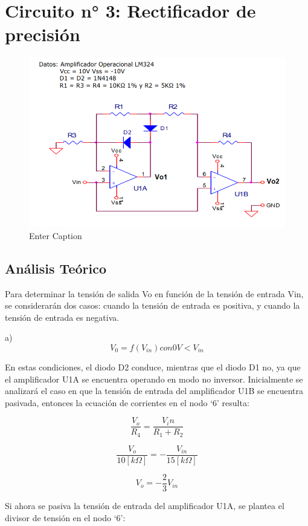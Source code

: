 \section{Circuito n° 3: Rectificador de precisión }

\begin{figure}
    \centering
    \includegraphics[width=0.5\linewidth]{Secciones/Circuito3/circuito.png}
    \caption{Enter Caption}
    \label{fig:enter-label}
\end{figure}

\subsection{Análisis Teórico}

Para determinar la tensión de salida Vo en función de la tensión de entrada Vin, se considerarán dos casos: cuando la tensión de entrada es positiva, y cuando la tensión de entrada es negativa.

a) \[V_0 = f(V_{in}) con 0V < V_{in}\]

En estas condiciones, el diodo D2 conduce, mientras que el diodo D1 no, ya que el amplificador U1A se encuentra operando en modo no inversor.
Inicialmente se analizará el caso en que la tensión de entrada del amplificador U1B se encuentra pasivada, entonces la ecuación de corrientes en el nodo ‘6’ resulta:

\begin{equation}
\frac{V_o}{R_4} = \frac{V_in}{R_1 + R_2}
\end{equation}

\begin{equation}
\frac{V_o}{10[k\Omega]} = -\frac{V_{in}}{15[k\Omega]}
\end{equation}

\begin{equation}
V_o = - \frac{2}{3}V_{in}
\end{equation}

Si ahora se pasiva la tensión de entrada del amplificador U1A, se plantea el divisor de tensión en el nodo ‘6’:

